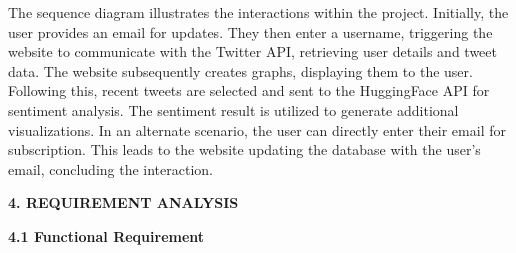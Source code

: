 \documentclass[a4paper,12pt]{article}
\begin{document}
{{{  The sequence diagram illustrates the interactions within the project. Initially, the user provides an email for updates. They then enter a username, triggering the website to communicate with the Twitter API, retrieving user details and tweet data. The website subsequently creates graphs, displaying them to the user. Following this, recent tweets are selected and sent to the HuggingFace API for sentiment analysis. The sentiment result is utilized to generate additional visualizations. In an alternate scenario, the user can directly enter their email for subscription. This leads to the website updating the database with the user's email, concluding the interaction.
















								 
		\newpage
				
		\begin{flushleft}
			\fontsize{14}{16}\selectfont\textbf{4. REQUIREMENT ANALYSIS }
			\label{requirement}
		\end{flushleft}



\begin{flushleft}
			\fontsize{13}{15}\selectfont\textbf{4.1 Functional Requirement}
			\phantomsection
			\label{fun}
		\end{flushleft}


}}}
\end{document}

